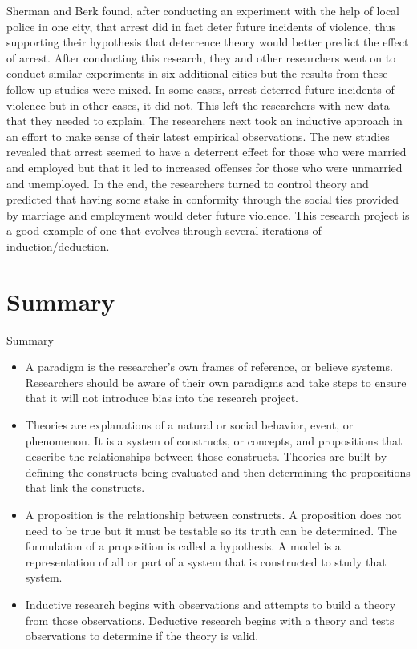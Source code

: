 Sherman and Berk found, after conducting an experiment with the help of local police in one city, that arrest did in fact deter future incidents of violence, thus supporting their hypothesis that deterrence theory would better predict the effect of arrest. After conducting this research, they and other researchers went on to conduct similar experiments in six additional cities but the results from these follow-up studies were mixed. In some cases, arrest deterred future incidents of violence but in other cases, it did not. This left the researchers with new data that they needed to explain. The researchers next took an inductive approach in an effort to make sense of their latest empirical observations. The new studies revealed that arrest seemed to have a deterrent effect for those who were married and employed but that it led to increased offenses for those who were unmarried and unemployed. In the end, the researchers turned to control theory and predicted that having some stake in conformity through the social ties provided by marriage and employment would deter future violence. This research project is a good example of one that evolves through several iterations of induction/deduction.

\section{Summary}

\begin{center}
	\begin{tkawybox}{Summary}
		\begin{itemize}
			\setlength{\itemsep}{0pt}
			\setlength{\parskip}{0pt}
			\setlength{\parsep}{0pt}
			
			\item A paradigm is the researcher's own frames of reference, or believe systems. Researchers should be aware of their own paradigms and take steps to ensure that it will not introduce bias into the research project.
			\item Theories are explanations of a natural or social behavior, event, or phenomenon. It is a system of constructs, or concepts, and propositions that describe the relationships between those constructs. Theories are built by defining the constructs being evaluated and then determining the propositions that link the constructs.
			\item A proposition is the relationship between constructs. A proposition does not need to be true but it must be testable so its truth can be determined. The formulation of a proposition is called a hypothesis. A model is a representation of all or part of a system that is constructed to study that system. 
			\item Inductive research begins with observations and attempts to build a theory from those observations. Deductive research begins with a theory and tests observations to determine if the theory is valid.
		\end{itemize}
	\end{tkawybox}
\end{center}

